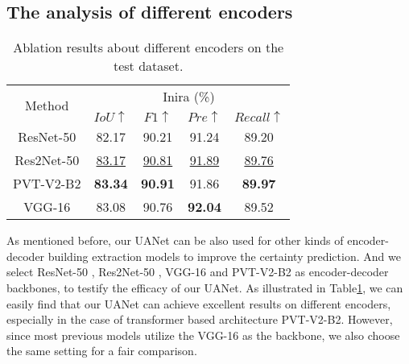 \documentclass[lettersize,journal]{IEEEtran}
\begin{document}
\subsection{The analysis of different encoders}
\begin{table}[]
\normalsize
\setlength\tabcolsep{3pt}
\caption{Ablation results about different encoders on the test dataset.}
\label{tab:table_Encoder}
\center
\begin{tabular}{c|cccc}
\hline
\multirow{2}{*}{Method} &\multicolumn{4}{c}{Inira (\%)}                                             
 \\ \cline{2-5} 
 & $IoU\uparrow$ & $F1\uparrow$ & $Pre\uparrow$ & $Recall\uparrow$ \\ \hline
ResNet-50&
82.17 &90.21 &91.24 &89.20\\
Res2Net-50&
\underline{83.17} &\underline{90.81} &\underline{91.89} &\underline{89.76}\\ 
PVT-V2-B2 &
\color{red}\textbf{83.34} &\color{red}\textbf{90.91} &91.86 &\color{red}\textbf{89.97}\\ 
VGG-16 &
{83.08}  &{90.76} &\color{red}\textbf{92.04} &{89.52}
\\ \hline
\end{tabular}
\end{table}
As mentioned before, our UANet can be also used for other kinds of encoder-decoder building extraction models to improve the certainty prediction. And we select ResNet-50 \cite{ResNet}, Res2Net-50 \cite{Res2Net}, VGG-16 \cite{VGG} and PVT-V2-B2 \cite{PVT} as encoder-decoder backbones, to testify the efficacy of our UANet. As illustrated in Table\ref{tab:table_Encoder}, we can easily find that our UANet can achieve excellent results on different encoders, especially in the case of transformer based architecture PVT-V2-B2. However, since most previous models utilize the VGG-16 as the backbone, we also choose the same setting for a fair comparison.
\end{document}
